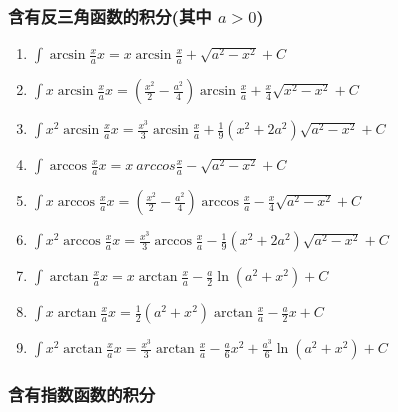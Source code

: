 \documentclass{book}
\begin{document}
\subsubsection{含有反三角函数的积分(其中 $a>0$)}

\begin {enumerate}

\item $ \int \arcsin \frac{x}{a}  x = x \arcsin \frac{x}{a} + \sqrt{a^2-x^2}+C $

\item $ \int x \arcsin \frac{x}{a}  x= (\frac{x^2}{2}-\frac{a^2}{4})\arcsin \frac{x}{a} + \frac{x}{4} \sqrt{x^2-x^2}+C$

\item $ \int x^2 \arcsin \frac{x}{a}  x = \frac{x^3}{3}\arcsin \frac{x}{a}+\frac{1}{9}(x^2+2 a^2)\sqrt{a^2-x^2}+C $

\item $ \int \arccos \frac{x}{a}  x= x \ arccos \frac{x}{a} - \sqrt{a^2-x^2} +C $

\item $ \int x \arccos \frac{x}{a}  x= (\frac{x^2}{2}-\frac{a^2}{4})\arccos \frac{x}{a} - \frac{x}{4} \sqrt{a^2-x^2}+C $

\item $ \int x^2 \arccos \frac{x}{a} x= \frac{x^3}{3}\arccos \frac{x}{a} - \frac{1}{9}(x^2+2a^2)\sqrt{a^2-x^2}+C$

\item $ \int \arctan \frac{x}{a}  x=x \arctan \frac{x}{a}-\frac{a}{2}\ln (a^2+x^2)+C $

\item $ \int x\arctan \frac{x}{a}  x = \frac{1}{2}(a^2+x^2)\arctan \frac{x}{a} -\frac{a}{2}x+C $

\item $ \int x^2 \arctan \frac{x}{a}  x= \frac{x^3}{3} \arctan \frac{x}{a} - \frac{a}{6}x^2 + \frac{a^3}{6} \ln (a^2+x^2)+C $

\end {enumerate}

\subsubsection{含有指数函数的积分}
\end{document}
